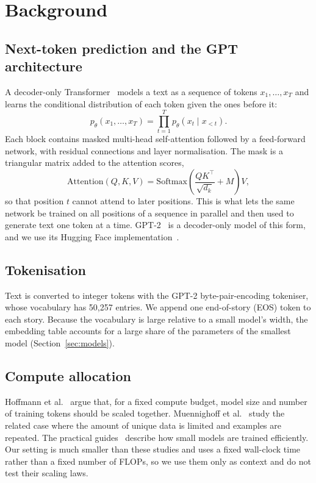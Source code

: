 \documentclass[11pt,a4paper]{article}
\begin{document}
\section{Background}
\subsection{Next-token prediction and the GPT architecture}
A decoder-only Transformer~\cite{AV17} models a text as a sequence of tokens $x_1,\dots,x_T$ and learns the conditional distribution of each token given the ones before it:
\begin{equation}
  p_\theta(x_1,\dots,x_T)=\prod_{t=1}^{T}p_\theta(x_t\mid x_{<t}).
\end{equation}
Each block contains masked multi-head self-attention followed by a feed-forward network, with residual connections and layer normalisation. The mask is a triangular matrix added to the attention scores,
\begin{equation}
  \text{Attention}(Q,K,V)=\text{Softmax}\!\left(\frac{QK^\top}{\sqrt{d_k}}+M\right)V,
\end{equation}
so that position $t$ cannot attend to later positions. This is what lets the same network be trained on all positions of a sequence in parallel and then used to generate text one token at a time. GPT-2~\cite{GPT2} is a decoder-only model of this form, and we use its Hugging Face implementation~\cite{HF}.

\subsection{Tokenisation}
Text is converted to integer tokens with the GPT-2 byte-pair-encoding tokeniser, whose vocabulary has 50,257 entries. We append one end-of-story (EOS) token to each story. Because the vocabulary is large relative to a small model's width, the embedding table accounts for a large share of the parameters of the smallest model (Section~\ref{sec:models}).

\subsection{Compute allocation}
Hoffmann et al.~\cite{Chin} argue that, for a fixed compute budget, model size and number of training tokens should be scaled together. Muennighoff et al.~\cite{Data} study the related case where the amount of unique data is limited and examples are repeated. The practical guides~\cite{Kar,Smol} describe how small models are trained efficiently. Our setting is much smaller than these studies and uses a fixed wall-clock time rather than a fixed number of FLOPs, so we use them only as context and do not test their scaling laws.
\end{document}
